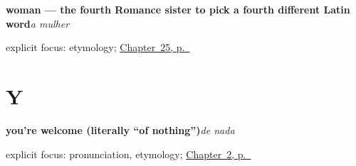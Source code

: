 \noindent\begin{minipage}[t]{\linewidth}
\raggedright
\textbf{woman — the fourth Romance sister to pick a fourth different Latin word}\enspace\emph{a mulher}\par
\footnotesize explicit focus: etymology; \hyperref[ch:pt-people-you-introduce]{Chapter~25, p.~\pageref*{ch:pt-people-you-introduce}}
\end{minipage}\par\smallskip

\section*{Y}

\noindent\begin{minipage}[t]{\linewidth}
\raggedright
\textbf{you're welcome (literally \textquotedblleft{}of nothing\textquotedblright{})}\enspace\emph{de nada}\par
\footnotesize explicit focus: pronunciation, etymology; \hyperref[ch:pt-how-are-you]{Chapter~2, p.~\pageref*{ch:pt-how-are-you}}
\end{minipage}\par\smallskip
